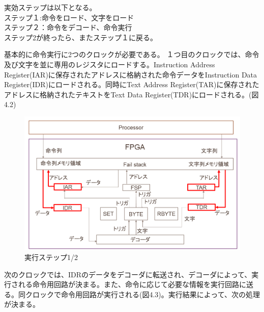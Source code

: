 \documentclass[12pt,oneside]{report}
\begin{document}
実効ステップは以下となる。\\
ステップ１:命令をロード、文字をロード\\
ステップ２：命令をデコード、命令実行\\
ステップ2が終ったら、またステップ１に戻る。


基本的に命令実行に2つのクロックが必要である。
１つ目のクロックでは、命令及び文字を並に専用のレジスタにロードする。Instruction Address Register(IAR)に保存されたアドレスに格納された命令データをInstruction Data Register(IDR)にロードされる。同時にText Address Register(TAR)に保存されたアドレスに格納されたテキストをText Data Register(TDR)にロードされる。(図4.2)\\

\begin{figure}[t]
    \begin{center}
        \includegraphics[width=130mm]{./fig/step1_2.png}
       \caption{実行ステップ1/2}
        \label{fig:step1_2}
    \end{center}
\end{figure}


次のクロックでは、IDRのデータをデコーダに転送され、デコーダによって、実行される命令用回路が決まる。また、命令に応じて必要な情報を実行回路に送る。同クロックで命令用回路が実行される(図4.3)。実行結果によって、次の処理が決まる。\\
\end{document}
